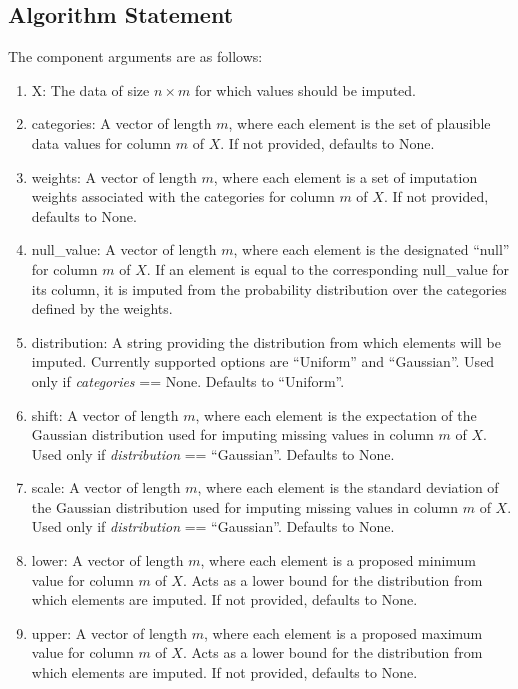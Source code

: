 \documentclass[11pt]{scrartcl} %
\begin{document}
\subsection{Algorithm Statement}
The component arguments are as follows:
\begin{enumerate}
    \item X: The data of size $n \times m$ for which values should be imputed.
    \item categories: A vector of length $m$, where each element is the set of plausible data values 
                      for column $m$ of $X$. If not provided, defaults to None.
    \item weights: A vector of length $m$, where each element is a set of imputation weights associated with the categories 
                   for column $m$ of $X$. If not provided, defaults to None.
    \item null\_value: A vector of length $m$, where each element is the designated ``null'' 
                      for column $m$ of $X$. If an element is equal to the corresponding null\_value
                      for its column, it is imputed from the probability distribution over the categories
                      defined by the weights.
    \item distribution: A string providing the distribution from which elements will be imputed. 
                        Currently supported options are ``Uniform'' and ``Gaussian''. 
                        Used only if \emph{categories} == None. 
                        Defaults to ``Uniform''.
    \item shift: A vector of length $m$, where each element is the expectation of the Gaussian distribution used 
                 for imputing missing values in column $m$ of $X$. Used only if \emph{distribution} == ``Gaussian''.
                 Defaults to None. 
    \item scale: A vector of length $m$, where each element is the standard deviation of the Gaussian distribution used 
                 for imputing missing values in column $m$ of $X$. Used only if \emph{distribution} == ``Gaussian''.
                 Defaults to None. 
    \item lower: A vector of length $m$, where each element is a proposed minimum value for column $m$ of $X$.
                 Acts as a lower bound for the distribution from which elements are imputed.
                 If not provided, defaults to None.
    \item upper: A vector of length $m$, where each element is a proposed maximum value for column $m$ of $X$.
                 Acts as a lower bound for the distribution from which elements are imputed.
                 If not provided, defaults to None. 
\end{enumerate}
\end{document}
